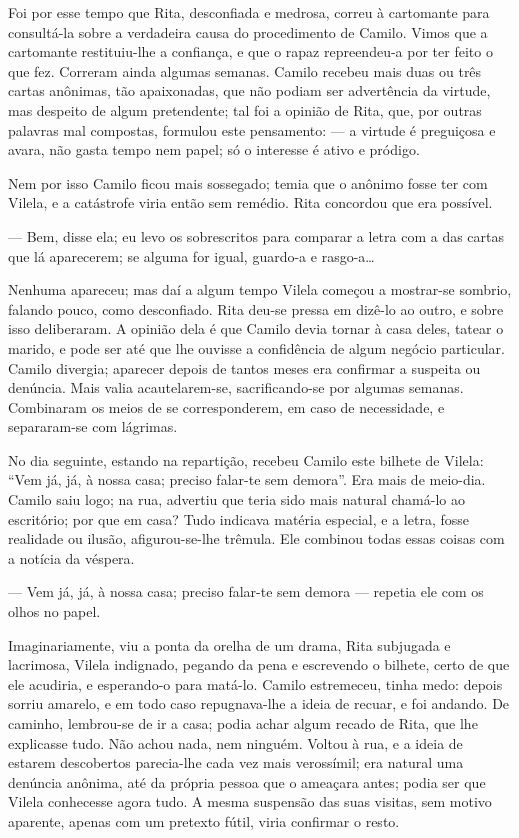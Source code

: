 Foi por esse tempo que Rita, desconfiada e medrosa, correu à cartomante
para consultá-la sobre a verdadeira causa do procedimento de Camilo.
Vimos que a cartomante restituiu-lhe a confiança, e que o rapaz
repreendeu-a por ter feito o que fez. Correram ainda algumas semanas.
Camilo recebeu mais duas ou três cartas anônimas, tão apaixonadas, que
não podiam ser advertência da virtude, mas despeito de algum
pretendente; tal foi a opinião de Rita, que, por outras palavras mal
compostas, formulou este pensamento: --- a virtude é preguiçosa e avara,
não gasta tempo nem papel; só o interesse é ativo e pródigo.

Nem por isso Camilo ficou mais sossegado; temia que o anônimo fosse ter
com Vilela, e a catástrofe viria então sem remédio. Rita concordou que
era possível.

--- Bem, disse ela; eu levo os sobrescritos para comparar a letra com a
das cartas que lá aparecerem; se alguma for igual, guardo-a e
rasgo-a\ldots{}

Nenhuma apareceu; mas daí a algum tempo Vilela começou a mostrar-se
sombrio, falando pouco, como desconfiado. Rita deu-se pressa em dizê-lo
ao outro, e sobre isso deliberaram. A opinião dela é que Camilo devia
tornar à casa deles, tatear o marido, e pode ser até que lhe ouvisse a
confidência de algum negócio particular. Camilo divergia; aparecer
depois de tantos meses era confirmar a suspeita ou denúncia. Mais valia
acautelarem-se, sacrificando-se por algumas semanas. Combinaram os meios
de se corresponderem, em caso de necessidade, e separaram-se com
lágrimas.

No dia seguinte, estando na repartição, recebeu Camilo este bilhete de
Vilela: ``Vem já, já, à nossa casa; preciso falar-te sem demora''. Era
mais de meio-dia. Camilo saiu logo; na rua, advertiu que teria sido mais
natural chamá-lo ao escritório; por que em casa? Tudo indicava matéria
especial, e a letra, fosse realidade ou ilusão, afigurou-se-lhe trêmula.
Ele combinou todas essas coisas com a notícia da véspera.

--- Vem já, já, à nossa casa; preciso falar-te sem demora --- repetia ele
com os olhos no papel.

Imaginariamente, viu a ponta da orelha de um drama, Rita subjugada e
lacrimosa, Vilela indignado, pegando da pena e escrevendo o bilhete,
certo de que ele acudiria, e esperando-o para matá-lo. Camilo
estremeceu, tinha medo: depois sorriu amarelo, e em todo caso
repugnava-lhe a ideia de recuar, e foi andando. De caminho, lembrou-se
de ir a casa; podia achar algum recado de Rita, que lhe explicasse tudo.
Não achou nada, nem ninguém. Voltou à rua, e a ideia de estarem
descobertos parecia-lhe cada vez mais verossímil; era natural uma
denúncia anônima, até da própria pessoa que o ameaçara antes; podia ser
que Vilela conhecesse agora tudo. A mesma suspensão das suas visitas,
sem motivo aparente, apenas com um pretexto fútil, viria confirmar o
resto.

